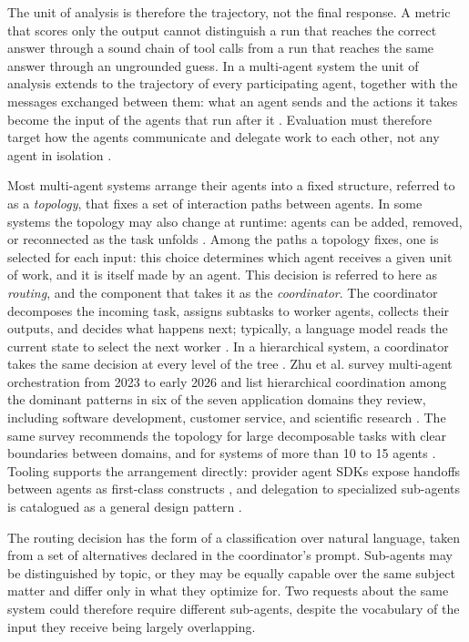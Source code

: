 The unit of analysis is therefore the trajectory, not the final response. A metric that scores only the output cannot distinguish a run that reaches the correct answer through a sound chain of tool calls from a run that reaches the same answer through an ungrounded guess. In a multi-agent system the unit of analysis extends to the trajectory of every participating agent, together with the messages exchanged between them: what an agent sends and the actions it takes become the input of the agents that run after it \cite{guoLargeLanguageModel2024}. Evaluation must therefore target how the agents communicate and delegate work to each other, not any agent in isolation \cite{zhuLLMBasedMultiAgentOrchestration2026a}.

Most multi-agent systems arrange their agents into a fixed structure, referred to as a \emph{topology}, that fixes a set of interaction paths between agents. In some systems the topology may also change at runtime: agents can be added, removed, or reconnected as the task unfolds \cite{zhuLLMBasedMultiAgentOrchestration2026a}. Among the paths a topology fixes, one is selected for each input: this choice determines which agent receives a given unit of work, and it is itself made by an agent. This decision is referred to here as \emph{routing}, and the component that takes it as the \emph{coordinator}. The coordinator decomposes the incoming task, assigns subtasks to worker agents, collects their outputs, and decides what happens next; typically, a language model reads the current state to select the next worker \cite{zhuLLMBasedMultiAgentOrchestration2026a}. In a hierarchical system, a coordinator takes the same decision at every level of the tree \cite{zhuLLMBasedMultiAgentOrchestration2026a}. Zhu et al. survey multi-agent orchestration from 2023 to early 2026 and list hierarchical coordination among the dominant patterns in six of the seven application domains they review, including software development, customer service, and scientific research \cite{zhuLLMBasedMultiAgentOrchestration2026a}. The same survey recommends the topology for large decomposable tasks with clear boundaries between domains, and for systems of more than 10 to 15 agents \cite{zhuLLMBasedMultiAgentOrchestration2026a}. Tooling supports the arrangement directly: provider agent SDKs expose handoffs between agents as first-class constructs \cite{OpenAIAgentsSDK}, and delegation to specialized sub-agents is catalogued as a general design pattern \cite[Chap.~7]{gulliAgenticDesignPatterns2025}.

The routing decision has the form of a classification over natural language, taken from a set of alternatives declared in the coordinator's prompt. Sub-agents may be distinguished by topic, or they may be equally capable over the same subject matter and differ only in what they optimize for. Two requests about the same system could therefore require different sub-agents, despite the vocabulary of the input they receive being largely overlapping.

